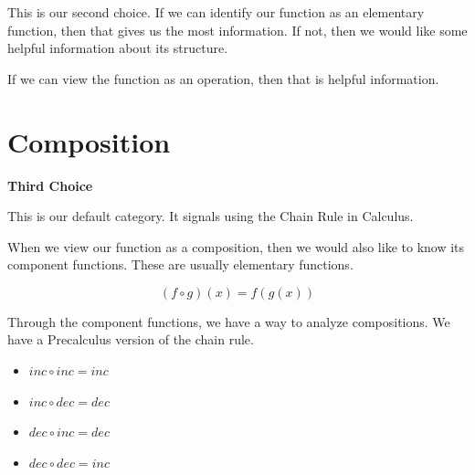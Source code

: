 \documentclass{ximera}
\begin{document}
This is our second choice.  If we can identify our function as an elementary function, then that gives us the most information. If not, then we would like some helpful information about its structure. 



If we can view the function as an operation, then that is helpful information.







































\section*{Composition}


\textbf{\textcolor{purple!85!blue}{Third Choice}} 

This is our default category.  It signals using the Chain Rule in Calculus. 


When we view our function as a composition, then we would also like to know its component functions. These are usually elementary functions. 



\[
(f \circ g)(x) = f(g(x))
\]



Through the component functions, we have a way to analyze compositions.  We have a Precalculus version of the chain rule.


\begin{itemize}
\item  $inc \circ inc = inc$
\item  $inc \circ dec = dec$
\item  $dec \circ inc = dec$
\item  $dec \circ dec = inc$
\end{itemize}
\end{document}
